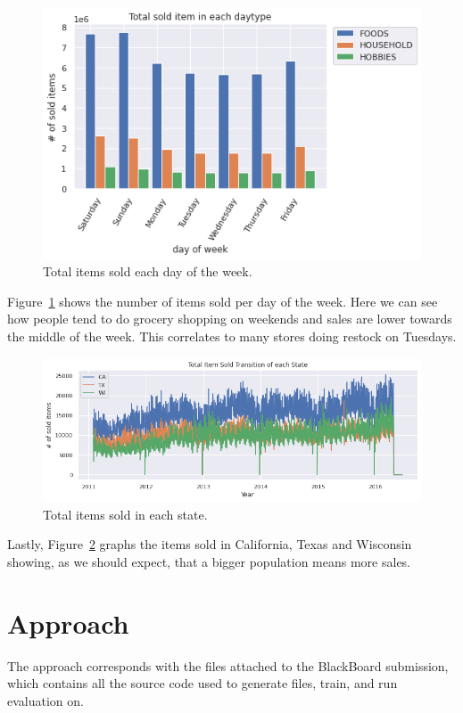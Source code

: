 \documentclass[10pt,twocolumn,letterpaper]{article}
\begin{document}
\begin{figure}
  \begin{center}
    \includegraphics[width=0.7\linewidth]{img/totalSoldItemInEachDayOfWeek.png}
  \end{center}
    \caption{Total items sold each day of the week. \cite{ryuheeeei_2020}}
  \label{fig:totalSoldItemInEachDayOfWeek}
\end{figure}
  Figure~\ref{fig:totalSoldItemInEachDayOfWeek} shows the number of items sold
  per day of the week. Here we can see how people tend to do grocery shopping on
  weekends and sales are lower towards the middle of the week. This correlates
  to many stores doing restock on Tuesdays.

\begin{figure}
  \begin{center}
    \includegraphics[width=0.7\linewidth]{img/totalItemSoldInEachState.png}
  \end{center}
    \caption{Total items sold in each state.\cite{ryuheeeei_2020}}
  \label{fig:totalItemSoldInEachState}
\end{figure}
  Lastly, Figure~\ref{fig:totalItemSoldInEachState} graphs the items sold in
  California, Texas and Wisconsin showing, as we should expect, that a bigger
  population means more sales.

\section{Approach}
  The approach corresponds with the files attached to the BlackBoard submission,
  which contains all the source code used to generate files, train, and run
  evaluation on.
\end{document}

